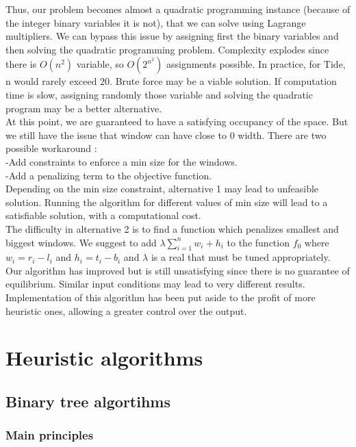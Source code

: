 \documentclass{acmtog}
\begin{document}
Thus, our problem becomes almost a quadratic programming instance (because of the integer binary variables it is not), that we can solve using Lagrange multipliers. %
We can bypass this issue by assigning first the binary variables and then solving the quadratic programming problem. Complexity explodes since there is $O(n^2)$ variable, so $O(2^{n^2})$ assignments possible. In practice, for Tide, n would rarely exceed 20. Brute force may be a viable solution. If computation time is slow, assigning randomly those variable and solving the quadratic program may be a better alternative. \\
At this point, we are guaranteed to have a satisfying occupancy of the space. But we still have the issue that window can have close to 0 width. There are two possible workaround : \\
-Add constraints to enforce a min size for the windows. \\%
-Add a penalizing term to the objective function. \\
Depending on the min size constraint, alternative 1 may lead to unfeasible solution. Running the algorithm for different values of min size will lead to a satisfiable solution, with a computational cost. \\
The difficulty in alternative 2 is to find a function which penalizes smallest and biggest windows. We suggest to add $\lambda \sum_{i = 1}^{n}{w_i + h_i}$ to the function $f_0$ where $w_i = r_i - l_i$ and $h_i = t_i - b_i$ and $\lambda$ is a real that must be tuned appropriately. \\
Our algorithm has improved but is still unsatisfying since there is no guarantee of equilibrium. %
Similar input conditions may lead to very different results. Implementation of this algorithm has been put aside to the profit of more heuristic ones, allowing a greater control over the output.


\section{Heuristic algorithms}

\subsection{Binary tree algortihms}

\subsubsection{Main principles}
\end{document}
